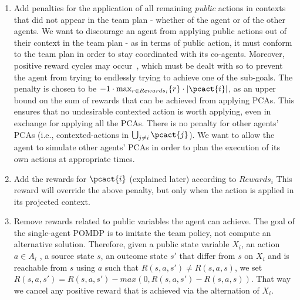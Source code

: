 {\begin{enumerate}
\item Add penalties for the application of all remaining \emph{public} actions in contexts that did not appear in the team plan - whether of the agent or of the other agents. We want to discourage an agent from applying public actions out of their context
in the team plan - as in terms of public action, it must conform to the team plan in order to stay coordinated with its co-agents. Moreover, positive reward cycles may occur~\cite{RLCYCLES}, which must be dealt with so to prevent the agent from trying to endlessly trying to achieve one of the sub-goals. The penalty is chosen to be $-1\cdot\max_{r\in Rewards_i}\{r\} \cdot|\pcact{i}|$, as an upper bound on the sum of rewards that can be achieved from applying PCAs. This ensures that no undesirable contexted action is worth applying, even in exchange for applying all the PCAs. There is no penalty for other agents' PCAs
(i.e., contexted-actions in $\bigcup_{j\neq i} \pcact{j}$). We want
to allow the agent to simulate other agents' PCAs in order to plan the execution of its own actions at appropriate times.
\item Add the rewards for $\pcact{i}$ (explained later) according to $Rewards_i$
This reward will override the above penalty, but only when the action is applied in its projected context.
\item 
Remove rewards related to public variables the agent
can achieve. The goal of the single-agent POMDP is to imitate the team policy, not compute an alternative solution.
Therefore, given a public state variable $X_i$, an action $a \in A_i$ , a source state $s$, an outcome state $s'$ that differ from $s$ on $X_i$ and is reachable from $s$ using $a$ such that $R(s, a, s')\neq R(s, a, s)$, we set $R(s,a,s') = R(s,a,s') - \textit{max}\left(0, R(s,a,s') - R(s,a,s)\right)$. That way we cancel any positive reward that is achieved via the alternation of $X_i$.

\end{enumerate}}
